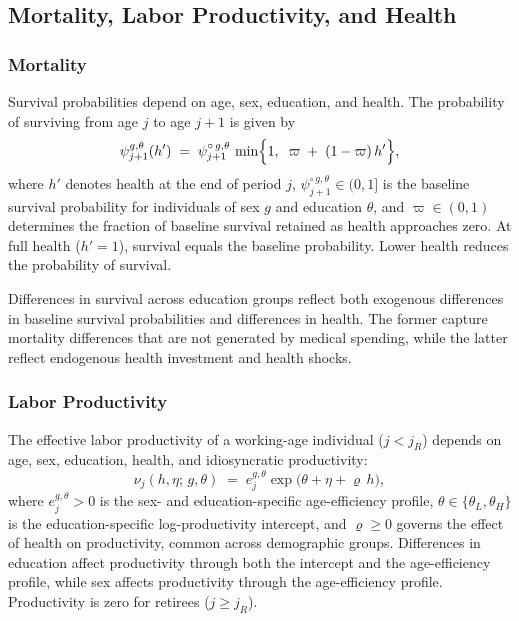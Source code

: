 \documentclass[12pt,a4paper]{article}
\begin{document}
\subsection{Mortality, Labor Productivity, and Health}
\label{subsec:exogenous}



\subsubsection{Mortality}
\label{subsubsec:mortality}

Survival probabilities depend on age, sex, education, and health. The probability of surviving from age $j$ to age $j+1$ is given by
\begin{equation}
\label{eq:survival_modulation}
\psi_{j+1}^{g,\theta}(h')
\;=\;
\psi^{\circ\, g,\theta}_{j+1}\,
\min\Bigl\{1,\;\; \varpi \;+\; (1-\varpi)\, h'\Bigr\},
\end{equation}
where $h'$ denotes health at the end of period $j$, $\psi^{\circ\, g,\theta}_{j+1} \in (0,1]$ is the baseline survival probability for individuals of sex $g$ and education $\theta$, and $\varpi \in (0,1)$ determines the fraction of baseline survival retained as health approaches zero. At full health ($h'=1$), survival equals the baseline probability. Lower health reduces the probability of survival.

Differences in survival across education groups reflect both exogenous differences in baseline survival probabilities and differences in health. The former capture mortality differences that are not generated by medical spending, while the latter reflect endogenous health investment and health shocks.


\subsubsection{Labor Productivity}
\label{subsubsec:productivity}

The effective labor productivity of a working-age individual ($j < j_R$) depends on age, sex, education, health, and idiosyncratic productivity:
\begin{equation}
\label{eq:labor_productivity}
\nu_j(h, \eta;\, g,\theta) \;=\; e_{j}^{g,\theta} \exp\bigl(\theta + \eta + \varrho\, h\bigr),
\end{equation}
where $e_j^{g,\theta} > 0$ is the sex- and education-specific age-efficiency profile, $\theta \in \{\theta_L,\theta_H\}$ is the education-specific log-productivity intercept, and $\varrho \geq 0$ governs the effect of health on productivity, common across demographic groups. Differences in education affect productivity through both the intercept and the age-efficiency profile, while sex affects productivity through the age-efficiency profile. Productivity is zero for retirees ($j \geq j_R$).
\end{document}
